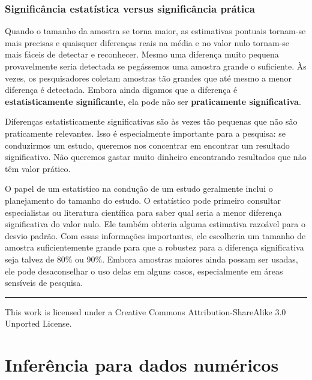 \documentclass[
]{book}
\theoremstyle{definition}
\theoremstyle{definition}
\theoremstyle{definition}
\theoremstyle{definition}
\theoremstyle{remark}
\begin{document}
\hypertarget{statisticalSignificancePracticalSignificance}{%
\subsection{Significância estatística versus significância prática}\label{statisticalSignificancePracticalSignificance}}

Quando o tamanho da amostra se torna maior, as estimativas pontuais tornam-se mais precisas e quaisquer diferenças reais na média e no valor nulo tornam-se mais fáceis de detectar e reconhecer. Mesmo uma diferença muito pequena provavelmente seria detectada se pegássemos uma amostra grande o suficiente. Às vezes, os pesquisadores coletam amostras tão grandes que até mesmo a menor diferença é detectada. Embora ainda digamos que a diferença é \textbf{estatisticamente significante}, ela pode não ser \textbf{praticamente significativa}.

Diferenças estatisticamente significativas são às vezes tão pequenas que não são praticamente relevantes. Isso é especialmente importante para a pesquisa: se conduzirmos um estudo, queremos nos concentrar em encontrar um resultado significativo. Não queremos gastar muito dinheiro encontrando resultados que não têm valor prático.

O papel de um estatístico na condução de um estudo geralmente inclui o planejamento do tamanho do estudo. O estatístico pode primeiro consultar especialistas ou literatura científica para saber qual seria a menor diferença significativa do valor nulo. Ele também obteria alguma estimativa razoável para o desvio padrão. Com essas informações importantes, ele escolheria um tamanho de amostra suficientemente grande para que a robustez para a diferença significativa seja talvez de 80\% ou 90\%. Embora amostras maiores ainda possam ser usadas, ele pode desaconselhar o uso delas em alguns casos, especialmente em áreas sensíveis de pesquisa.

\begin{center}\rule{0.5\linewidth}{0.5pt}\end{center}

This work is licensed under a Creative Commons Attribution-ShareAlike 3.0 Unported License.

\hypertarget{ch5-inf-num}{%
\chapter{Inferência para dados numéricos}\label{ch5-inf-num}}
\end{document}
